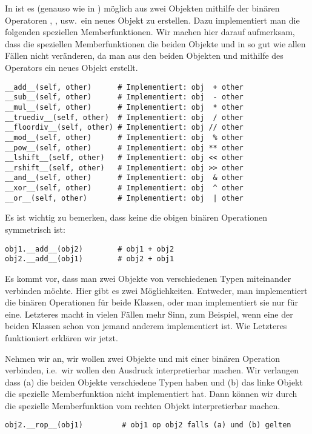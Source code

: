 In \Python ist es (genauso wie in \CPP) möglich aus zwei Objekten mithilfe der binären Operatoren
\lpy{+}, \lpy{-}, \lpy{*} usw.\ ein neues Objekt zu erstellen.
Dazu implementiert man die folgenden speziellen Memberfunktionen.
Wir machen hier darauf aufmerksam, dass die speziellen Memberfunktionen die beiden Objekte  und 
in so gut wie allen Fällen nicht veränderen, da man aus den beiden Objekten  und 
mithilfe des Operators  ein neues Objekt  erstellt.
\begin{lstlisting}
__add__(self, other)      # Implementiert: obj  + other
__sub__(self, other)      # Implementiert: obj  - other
__mul__(self, other)      # Implementiert: obj  * other
__truediv__(self, other)  # Implementiert: obj  / other
__floordiv__(self, other) # Implementiert: obj // other
__mod__(self, other)      # Implementiert: obj  % other
__pow__(self, other)      # Implementiert: obj ** other
__lshift__(self, other)   # Implementiert: obj << other
__rshift__(self, other)   # Implementiert: obj >> other
__and__(self, other)      # Implementiert: obj  & other
__xor__(self, other)      # Implementiert: obj  ^ other
__or__(self, other)       # Implementiert: obj  | other
\end{lstlisting}

Es ist wichtig zu bemerken, dass keine die obigen binären Operationen symmetrisch ist:
\begin{lstlisting}
obj1.__add__(obj2)        # obj1 + obj2
obj2.__add__(obj1)        # obj2 + obj1
\end{lstlisting}
Es kommt vor, dass man zwei Objekte von verschiedenen Typen miteinander verbinden möchte.
Hier gibt es zwei Möglichkeiten.
Entweder, man implementiert die binären Operationen für beide Klassen, oder man implementiert sie nur für eine.
Letzteres macht in vielen Fällen mehr Sinn, zum Beispiel, wenn eine der beiden Klassen schon von jemand anderem implementiert ist.
Wie Letzteres funktioniert erklären wir jetzt.

Nehmen wir an, wir wollen zwei Objekte  und  mit einer binären Operation  verbinden,
i.e.\ wir wollen den Ausdruck  interpretierbar machen.
Wir verlangen dass
(a) die beiden Objekte verschiedene Typen haben und
(b) das linke Objekt  die spezielle Memberfunktion  nicht implementiert hat.
Dann können wir  durch die spezielle Memberfunktion  vom rechten Objekt  interpretierbar machen.
\begin{lstlisting}
obj2.__rop__(obj1)         # obj1 op obj2 falls (a) und (b) gelten
\end{lstlisting}

